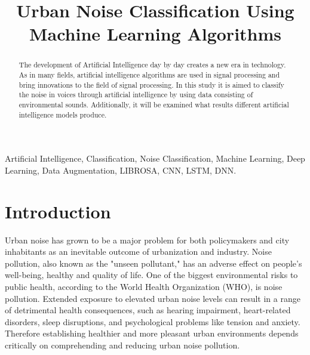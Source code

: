 \documentclass[conference]{IEEEtran}
\begin{document}
\title{Urban Noise Classification Using Machine Learning Algorithms}


\author{
}



\maketitle

\begin{abstract}
The development of Artificial Intelligence day by day creates a new era in technology. As in many fields, artificial intelligence algorithms are used in signal processing and bring innovations to the field of signal processing. In this study it is aimed to classify the noise in voices through artificial intelligence by using data consisting of environmental sounds.\cite{ali2021voice}\cite{verde2018voice} Additionally, it will be examined what results different artificial intelligence models produce.
\end{abstract}

\begin{IEEEkeywords}
Artificial Intelligence, Classification, Noise Classification, Machine Learning, Deep Learning, Data Augmentation, LIBROSA, CNN, LSTM, DNN.
\end{IEEEkeywords}

\section{Introduction}

Urban noise has grown to be a major problem for both policymakers and city inhabitants as an inevitable outcome of urbanization and industry. Noise pollution, also known as the "unseen pollutant," has an adverse effect on people's well-being, healthy and quality of life. One of the biggest environmental risks to public health, according to the World Health Organization (WHO), is noise pollution.\cite{WHO2018} Extended exposure to elevated urban noise levels can result in a range of detrimental health consequences, such as hearing impairment, heart-related disorders, sleep disruptions, and psychological problems like tension and anxiety. Therefore establishing healthier and more pleasant urban environments depends critically on comprehending and reducing urban noise pollution.
\end{document}
